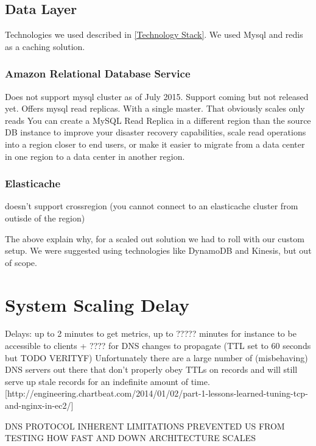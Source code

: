 \documentclass{uvamscse}
\begin{document}
\subsection{Data Layer}

Technologies we used described in \ref{Technology Stack}. We used Mysql and redis as a caching solution.

\subsubsection{Amazon Relational Database Service}
Does not support mysql cluster as of July 2015. Support coming but not released yet.
Offers mysql read replicas. With a single master. That obviously scales only reads
You can create a MySQL Read Replica in a different region than the source DB instance to improve your disaster recovery capabilities, scale read operations into a region closer to end users, or make it easier to migrate from a data center in one region to a data center in another region.

\subsubsection{Elasticache}
doesn't support crossregion (you cannot connect to an elasticache cluster from outisde of the region)

The above explain why, for a scaled out solution we had to roll with our custom setup. We were suggested using technologies like DynamoDB and Kinesis, but out of scope.

\section{System Scaling Delay}
Delays: up to 2 minutes to get metrics, up to ????? minutes for instance to be accessible to clients + ???? for DNS changes to propagate (TTL set to 60 seconds but TODO VERITYF)
Unfortunately there are a large number of (misbehaving) DNS servers out there that don’t properly obey TTLs on records and will still serve up stale records for an indefinite amount of time. [http://engineering.chartbeat.com/2014/01/02/part-1-lessons-learned-tuning-tcp-and-nginx-in-ec2/]

DNS PROTOCOL INHERENT LIMITATIONS PREVENTED US FROM TESTING HOW FAST AND DOWN ARCHITECTURE SCALES


\end{document}
